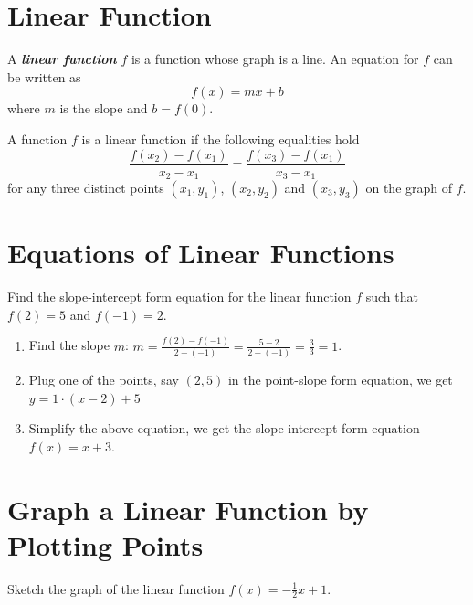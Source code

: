 \documentclass[en,12pt]{elegantbook}
\providecommand{\tightlist}{%
  \setlength{\itemsep}{0pt}\setlength{\parskip}{0pt}}
\providecommand{\tightlist}{%
  \setlength{\itemsep}{0pt}\setlength{\parskip}{0pt}}
\let\BeginKnitrBlock\begin \let\EndKnitrBlock\end
\begin{document}
\hypertarget{linear-function}{%
\section{Linear Function}\label{linear-function}}

A \textbf{\emph{linear function}} \(f\) is a function whose graph is a line. An equation for \(f\) can be written as
\[f(x) = mx + b\]
where \(m\) is the slope and \(b=f(0)\).

A function \(f\) is a linear function if the following equalities hold
\[
\dfrac{f(x_2)-f(x_1)}{x_2-x_1}
=\dfrac{f(x_3)-f(x_1)}{x_3-x_1}
\]
for any three distinct points \((x_1, y_1)\), \((x_2, y_2)\) and \((x_3, y_3)\) on the graph of \(f\).

\hypertarget{equations-of-linear-functions}{%
\section{Equations of Linear Functions}\label{equations-of-linear-functions}}

\BeginKnitrBlock{example}
\protect\hypertarget{exm:unnamed-chunk-234}{}{\label{exm:unnamed-chunk-234} }
Find the slope-intercept form equation for the linear function \(f\) such that \(f(2)=5\) and \(f(-1) = 2\).
\EndKnitrBlock{example}

\BeginKnitrBlock{solution}


\begin{enumerate}
\def\labelenumi{\arabic{enumi}.}
\tightlist
\item
  Find the slope \(m\): \(m=\frac{f(2)-f(-1)}{2-(-1)}=\frac{5-2}{2-(-1)}=\frac{3}{3}=1\).
\item
  Plug one of the points, say \((2, 5)\) in the point-slope form equation, we get \(y=1\cdot(x-2)+5\)
\item
  Simplify the above equation, we get the slope-intercept form equation \(f(x)=x+3\).
\end{enumerate}
\EndKnitrBlock{solution}

\hypertarget{graph-a-linear-function-by-plotting-points}{%
\section{Graph a Linear Function by Plotting Points}\label{graph-a-linear-function-by-plotting-points}}

\BeginKnitrBlock{example}
\protect\hypertarget{exm:unnamed-chunk-236}{}{\label{exm:unnamed-chunk-236} }
Sketch the graph of the linear function \(f(x)=-\frac12 x + 1\).
\EndKnitrBlock{example}
\end{document}
